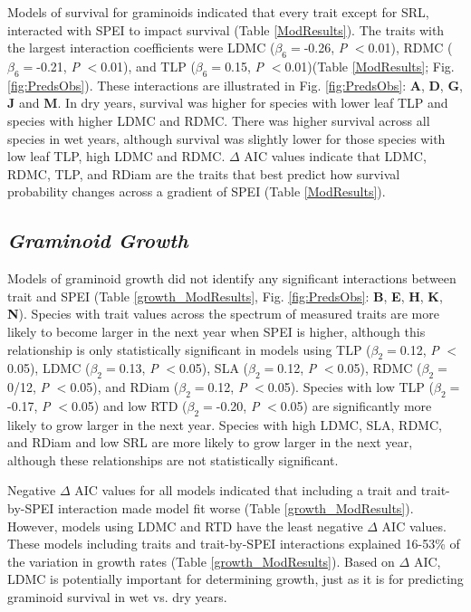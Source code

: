 \documentclass[12pt, letterpaper]{article}
\begin{document}
Models of survival for graminoids indicated that every trait except for SRL, interacted with SPEI to impact survival (Table \ref{ModResults}). The traits with the largest interaction coefficients were LDMC ($\beta _6=$-0.26,  \textit{P} $<$0.01), RDMC ($\beta _6=$-0.21,  \textit{P} $<$0.01), and TLP ($\beta _6=$0.15,  \textit{P} $<$0.01)(Table \ref{ModResults}; Fig. \ref{fig:PredsObs}). These interactions are illustrated in Fig. \ref{fig:PredsObs}: \textbf{A}, \textbf{D}, \textbf{G}, \textbf{J} and \textbf{M}. In dry years, survival was higher for species with lower leaf TLP and species with higher LDMC and RDMC. There was higher survival across all species in wet years, although survival was slightly lower for those species with low leaf TLP, high LDMC and RDMC. $\Delta$ AIC values indicate that LDMC, RDMC, TLP, and RDiam are the traits that best predict how survival probability changes across a gradient of SPEI (Table \ref{ModResults}). 

\subsection{\textit{Graminoid Growth}} Models of graminoid growth did not identify any significant interactions between trait and SPEI (Table \ref{growth_ModResults}, Fig. \ref{fig:PredsObs}: \textbf{B}, \textbf{E}, \textbf{H}, \textbf{K}, \textbf{N}). 
Species with trait values across the spectrum of measured traits are more likely to become larger in the next year when SPEI is higher, although this relationship is only statistically significant in models using TLP ($\beta _2=$0.12,  \textit{P} $<$0.05), LDMC ($\beta _2=$0.13,  \textit{P} $<$0.05), SLA ($\beta _2=$0.12,  \textit{P} $<$0.05), RDMC ($\beta _2=$0/12,  \textit{P} $<$0.05), and RDiam ($\beta _2=$0.12,  \textit{P} $<$0.05). Species with low TLP ($\beta _2=$-0.17,  \textit{P} $<$0.05) and low RTD ($\beta _2=$-0.20,  \textit{P} $<$0.05) are significantly more likely to grow larger in the next year. Species with high LDMC, SLA, RDMC, and RDiam and low SRL are more likely to grow larger in the next year, although these relationships are not statistically significant.  

Negative $\Delta$ AIC values for all models indicated that including a trait and trait-by-SPEI interaction made model fit worse (Table \ref{growth_ModResults}). 
However, models using LDMC and RTD have the least negative $\Delta$ AIC values. These models including traits and trait-by-SPEI interactions explained 16-53\% of the variation in growth rates (Table \ref{growth_ModResults}). Based on $\Delta$ AIC, LDMC is potentially important for determining growth, just as it is for predicting graminoid survival in wet vs. dry years. 
\end{document}
